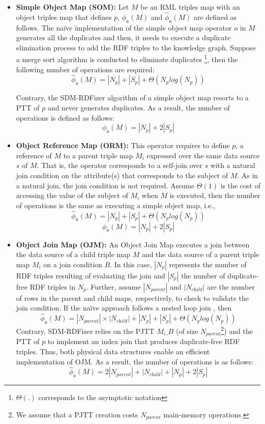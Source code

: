 \begin{itemize}
    \item \textbf{Simple Object Map (SOM):}
    Let $M$ be an RML triples map with an object triples map that defines $p$, $\phi_{\texttt{o}}(M)$ and $\widehat{\phi}_{\texttt{o}}(M)$ are defined as follows.  
  The na\"ive implementation of the simple object map operator $o$ in $M$ generates all the duplicates and then, it needs to execute a duplicate elimination process to add the RDF triples to the knowledge graph. Suppose a merge sort algorithm is conducted to eliminate duplicates \citep{BittonD83}\footnote{$\Theta(.)$ corresponds to the asymptotic notation}, then the following number of operations are required: 
       \[\widehat{\phi}_{\texttt{o}}(M)=
        |N_{p}| + |S_{p}| + \Theta(N_{p}log(N_{p}))\]
       
Contrary, the SDM-RDFizer algorithm of a simple object map resorts to a PTT of $p$ and never generates duplicates. As a result, the number of operations is defined as follows:
       \[ \phi_{\texttt{o}}(M)=|N_{p}| + 2|S_{p}|\]
       
    \item \textbf{Object Reference Map (ORM):} 
    This operator requires to define $p$, a reference of $M$ to a parent triple map $M_i$ expressed over the same data source $s$ of $M$. That is, the operator corresponds to a self-join over $s$ with a natural join condition on the attribute(s) that corresponds to the subject of $M$. As in a natural join, the join condition is not required. Assume $\Theta(1)$ is the cost of accessing the value of the subject of $M_i$ when $M$ is executed, then the number of operations is the same as executing a simple object map, i.e., 
    \[\widehat{\phi}_{\texttt{o}}(M)=
        |N_{p}| + |S_{p}| + \Theta(N_{p}log(N_{p}))\]
    \[ \phi_{\texttt{o}}(M)=|N_{p}| + 2|S_{p}|\]    
    \item \textbf{Object Join Map (OJM):}
    An Object Join Map executes a join between the data source of a child triple map $M$ and the data source of a parent triple map $M_i$ on a join condition $B$. In this case, $|N_p|$ represents the number of RDF triples resulting of evaluating the join and $|S_p|$ the number of duplicate-free RDF triples in $N_p$. Further, assume $|N_{\textit{parent}}|$ and $|N_{\textit{child}}|$ are the number of rows in the parent and child maps, respectively, to check to validate the join condition. If the na\"ive approach follows a nested loop join \citep{SteinbrunnMK97}, then 
    \[\widehat{\phi}_{\texttt{o}}(M)= |N_{\textit{parent}}| \times |N_{\textit{child}}| +
        |N_{p}| + |S_{p}| + \Theta(N_{p}log(N_{p}))\]
 Contrary, SDM-RDFizer relies on the PJTT $M_i \_B$ (of size $N_{\textit{parent}}$\footnote{We assume that a PJTT creation costs $N_{\textit{parent}}$ main-memory operations.}) and the PTT of $p$ to implement an index join that produces duplicate-free RDF triples. Thus, both physical data structures enable an efficient implementation of OJM. As a result, the number of operations is as follows:
 \[\widehat{\phi}_{\texttt{o}}(M)= 2|N_{\textit{parent}}| + |N_{\textit{child}}| +
        |N_{p}| + 2|S_{p}|\]
\end{itemize}


